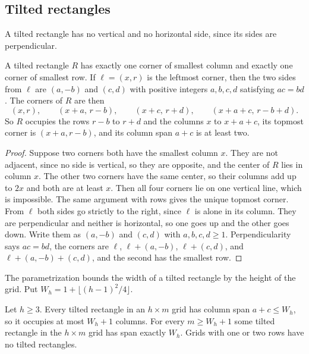 \subsection{Tilted rectangles}

A tilted rectangle has no vertical and no horizontal side, since its sides are perpendicular.

\begin{lemma}\label{lem:leftmost}
A tilted rectangle $R$ has exactly one corner of smallest column and exactly one corner of smallest row. If $\ell=(x,r)$ is the leftmost corner, then the two sides from $\ell$ are $(a,-b)$ and $(c,d)$ with positive integers $a,b,c,d$ satisfying $ac=bd$. The corners of $R$ are then
\begin{equation}\label{eq:tilt-param}
(x,r),\qquad(x+a,\,r-b),\qquad(x+c,\,r+d),\qquad(x+a+c,\,r-b+d).
\end{equation}
So $R$ occupies the rows $r-b$ to $r+d$ and the columns $x$ to $x+a+c$, its topmost corner is $(x+a,r-b)$, and its column span $a+c$ is at least two.
\end{lemma}

\begin{proof}
Suppose two corners both have the smallest column $x$. They are not adjacent, since no side is vertical, so they are opposite, and the center of $R$ lies in column $x$. The other two corners have the same center, so their columns add up to $2x$ and both are at least $x$. Then all four corners lie on one vertical line, which is impossible. The same argument with rows gives the unique topmost corner. From $\ell$ both sides go strictly to the right, since $\ell$ is alone in its column. They are perpendicular and neither is horizontal, so one goes up and the other goes down. Write them as $(a,-b)$ and $(c,d)$ with $a,b,c,d\ge1$. Perpendicularity says $ac=bd$, the corners are $\ell$, $\ell+(a,-b)$, $\ell+(c,d)$, and $\ell+(a,-b)+(c,d)$, and the second has the smallest row.
\end{proof}

The parametrization bounds the width of a tilted rectangle by the height of the grid. Put $W_h=1+\lfloor(h-1)^2/4\rfloor$.

\begin{lemma}\label{lem:span}
Let $h\ge3$. Every tilted rectangle in an $h\times m$ grid has column span $a+c\le W_h$, so it occupies at most $W_h+1$ columns. For every $m\ge W_h+1$ some tilted rectangle in the $h\times m$ grid has span exactly $W_h$. Grids with one or two rows have no tilted rectangles.
\end{lemma}

